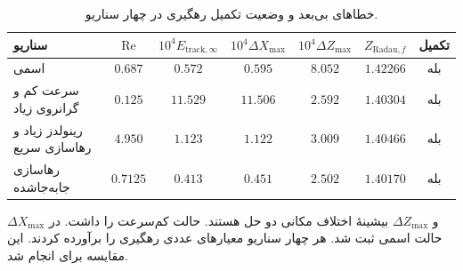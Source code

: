 \begin{table}[htbp]
\centering
\small
\setlength{\tabcolsep}{4pt}
\renewcommand{\arraystretch}{0.85}
\caption{خطاهای بی‌بعد و وضعیت تکمیل رهگیری در چهار سناریو.}
\label{tab:results-master9-tracking}
\begin{tabular}{@{}lcccccc@{}}
\hline
سناریو & $\mathrm{Re}$ & $10^4 E_{\mathrm{track},\infty}$ &
$10^4\Delta X_{\max}$ & $10^4\Delta Z_{\max}$ &
$Z_{\mathrm{Radau},f}$ & تکمیل \\
\hline
اسمی & $0.687$ & $0.572$ & $0.595$ & $8.052$ & $1.42266$ & بله \\
سرعت کم و گرانروی زیاد & $0.125$ & $11.529$ & $11.506$ & $2.592$ & $1.40304$ & بله \\
رینولدز زیاد و رهاسازی سریع & $4.950$ & $1.123$ & $1.122$ & $3.009$ & $1.40466$ & بله \\
رهاسازی جابه‌جاشده & $0.7125$ & $0.413$ & $0.451$ & $2.502$ & $1.40170$ & بله \\
\hline
\end{tabular}
\end{table}

$\Delta X_{\max}$ و $\Delta Z_{\max}$ بیشینهٔ اختلاف مکانی دو حل هستند.
حالت کم‌سرعت  را داشت.
 در حالت اسمی ثبت شد.
هر چهار سناریو معیارهای عددی رهگیری را برآورده کردند.
این مقایسه برای   انجام شد.


